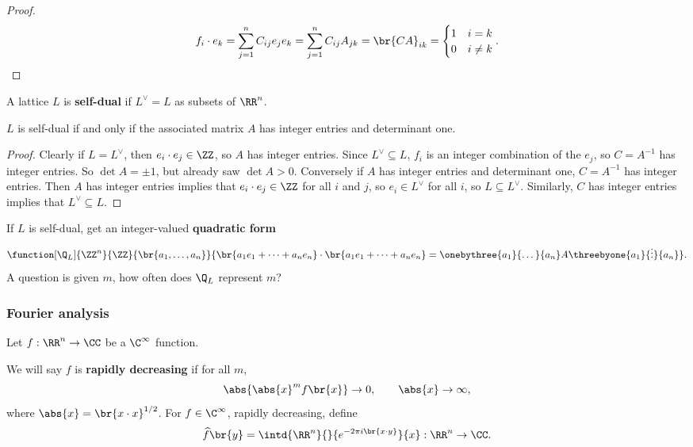 \begin{proof}
$$ f_i \cdot e_k = \sum_{j = 1}^n C_{ij}e_je_k = \sum_{j = 1}^n C_{ij}A_{jk} = \br{CA}_{ik} =
\begin{cases}
1 & i = k \\
0 & i \ne k
\end{cases}.
$$
\end{proof}

\begin{definition}
A lattice $ L $ is \textbf{self-dual} if $ L^\vee = L $ as subsets of $ \RR^n $.
\end{definition}

\begin{proposition}
$ L $ is self-dual if and only if the associated matrix $ A $ has integer entries and determinant one.
\end{proposition}

\begin{proof}
Clearly if $ L = L^\vee $, then $ e_i \cdot e_j \in \ZZ $, so $ A $ has integer entries. Since $ L^\vee \subseteq L $, $ f_i $ is an integer combination of the $ e_j $, so $ C = A^{-1} $ has integer entries. So $ \det A = \pm 1 $, but already saw $ \det A > 0 $. Conversely if $ A $ has integer entries and determinant one, $ C = A^{-1} $ has integer entries. Then $ A $ has integer entries implies that $ e_i \cdot e_j \in \ZZ $ for all $ i $ and $ j $, so $ e_i \in L^\vee $ for all $ i $, so $ L \subseteq L^\vee $. Similarly, $ C $ has integer entries implies that $ L^\vee \subseteq L $.
\end{proof}

If $ L $ is self-dual, get an integer-valued \textbf{quadratic form}
$$ \function[\Q_L]{\ZZ^n}{\ZZ}{\br{a_1, \dots, a_n}}{\br{a_1e_1 + \dots + a_ne_n} \cdot \br{a_1e_1 + \dots + a_ne_n} = \onebythree{a_1}{\dots}{a_n}A\threebyone{a_1}{\vdots}{a_n}}. $$
A question is given $ m $, how often does $ \Q_L $ represent $ m $?

\pagebreak

\subsubsection{Fourier analysis}


Let $ f : \RR^n \to \CC $ be a $ \C^\infty $ function.

\begin{definition}
We will say $ f $ is \textbf{rapidly decreasing} if for all $ m $,
$$ \abs{\abs{x}^mf\br{x}} \to 0, \qquad \abs{x} \to \infty, $$
where $ \abs{x} = \br{x \cdot x}^{1 / 2} $. For $ f \in \C^\infty $, rapidly decreasing, define
$$ \widehat{f}\br{y} = \intd{\RR^n}{}{e^{-2\pi i\br{x \cdot y}}}{x} : \RR^n \to \CC. $$
\end{definition}

